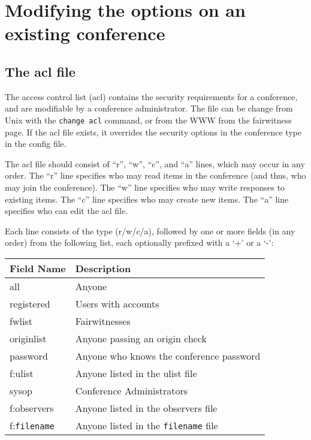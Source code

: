 \documentclass[twoside]{report}
\begin{document}
   \section{Modifying the options on an existing conference} \label{s:modify}
      \subsection{The acl file} \label{s:acl}
         The access control list (acl) contains the security
         requirements for a conference, and are modifiable by a
         conference administrator.  The file can be change from Unix with the
         {\tt change acl} command, or from the WWW from the fairwitness
         page.  If the acl file exists, it overrides the security options 
         in the conference type in the config file.
         
         The acl file should consist of ``r'', ``w'', 
         ``c'', and ``a'' lines, which may occur in any order.  The ``r'' line 
         specifies who may read items in the conference (and thus, who 
         may join the conference).  The ``w'' line specifies who may write 
         responses to existing items.  The ``c'' line specifies who may 
         create new items. The ``a'' line specifies who can edit the 
         acl file.
        
         Each line consists of the type (r/w/c/a), followed by one or more
         fields (in any order) from the following list, each optionally 
         prefixed with a `+' or a `-':
         \par
         \begin{tabular}{lp{4.5in}} 
            Field Name                   & Description \\ \hline
            all                          &  Anyone \\
            registered                   &  Users with accounts \\
            fwlist                       &  Fairwitnesses \\
            originlist\index{originlist} &  Anyone passing an origin check \\
            password\index{password}     &  Anyone who knows the conference 
                                            password \\
            f:ulist\index{ulist}         &  Anyone listed in the ulist file \\
            sysop\index{sysop}           &  Conference Administrators \\
            f:observers\index{observers} &  Anyone listed in the 
                                            observers file \\
            f:{\tt filename}             &  Anyone listed in the 
                                            {\tt filename} file \\
         \end{tabular}
      \vspace{12pt}
\end{document}
